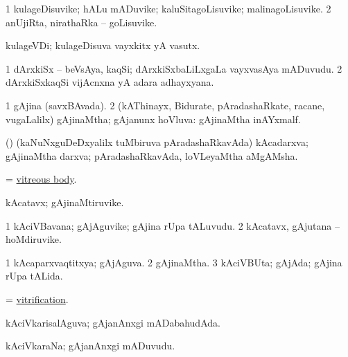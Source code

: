 \bentry 
{} 
\gl{\nA}
\expl{}
\bmng
\bnum
\num{1} kulageDisuvike; hALu mADuvike; kaluSitagoLisuvike; malinagoLisuvike. 
\num{2} anUjiRta, nirathaRka -- goLisuvike. 
\enum
\emng
\eentry

\bentry 
{} 
\gl{\nA}
\expl{}
\bmng
 kulageVDi; kulageDisuva vayxkitx yA vasutx. 
\emng
\eentry

\bentry 
{} 
\gl{\nA}
\expl{}
\bmng
\bnum
\num{1} dArxkiSx -- beVsAya, kaqSi; dArxkiSxbaLiLxgaLa vayxvasAya mADuvudu. 
\num{2} dArxkiSxkaqSi vijAcnxna yA adara adhayxyana. 
\enum
\emng
\eentry

\bentry
{} 
\gl{\gu}
\expl{}
\bmng
\bnum
\num{1} gAjina (savxBAvada). 
\num{2} (kAThinayx, Bidurate, pAradashaRkate, racane, \mo vugaLalilx) gAjinaMtha; gAjanunx hoVluva:  gAjinaMtha inAYxmalf. 
\enum
\emng
\eentry

\bentry
{}
\gl{\nA}
\expl{}
\bmng
 (\aMrashA) (kaNuNxguDeDxyalilx tuMbiruva pAradashaRkavAda) kAcadarxva; gAjinaMtha darxva; pAradashaRkavAda, loVLeyaMtha aMgAMsha. 
\emng
\eentry

\bentry 
{}
\gl{\nA}
\expl{}
\bmng
 = \hyperlink{vitreous body}{vitreous body}. 
\emng
\eentry

\bentry
{} 
\gl{\nA}
\expl{}
\bmng
 kAcatavx; gAjinaMtiruvike. 
\emng
\eentry

\bentry
{} 
\gl{\nA}
\expl{}
\bmng
\bnum
\num{1} kAciVBavana; gAjAguvike; gAjina rUpa tALuvudu. 
\num{2} kAcatavx, gAjutana -- hoMdiruvike. 
\enum
\emng
\eentry

\bentry 
{} 
\gl{\gu}
\expl{}
\bmng
\bnum
\num{1} kAcaparxvaqtitxya; gAjAguva. 
\num{2} gAjinaMtha. 
\num{3} kAciVBUta; gAjAda; gAjina rUpa tALida. 
\enum
\emng
\eentry

\bentry 
{} 
\gl{\nA}
\expl{}
\bmng
 = \hyperlink{vitrification}{vitrification}. 
\emng
\eentry

\bentry
{} 
\gl{\gu}
\expl{}
\bmng
 kAciVkarisalAguva; gAjanAnxgi mADabahudAda. 
\emng
\eentry

\bentry 
{} 
\gl{\nA}
\expl{}
\bmng
 kAciVkaraNa; gAjanAnxgi mADuvudu. 
\emng
\eentry

